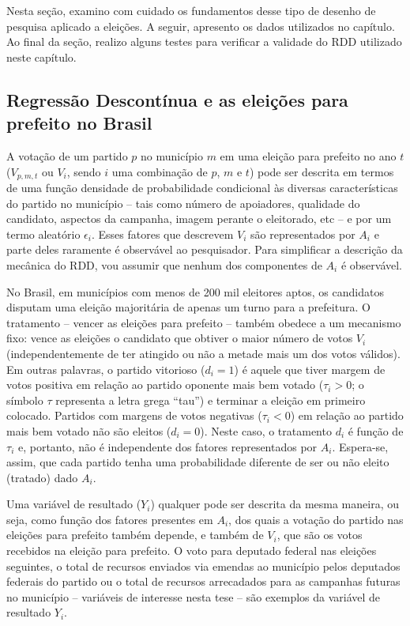 Nesta seção, examino com cuidado os fundamentos desse tipo de desenho de pesquisa aplicado a eleições. A seguir, apresento os dados utilizados no capítulo. Ao final da seção, realizo alguns testes para verificar a validade do RDD utilizado neste capítulo.

\subsection{Regressão Descontínua e as eleições para prefeito no Brasil}

A votação de um partido $p$ no município $m$ em uma eleição para prefeito no ano $t$  ($V_{p,m,t}$ ou $V_{i}$, sendo $i$ uma combinação de $p$, $m$ e $t$) pode ser descrita em termos de uma função densidade de probabilidade condicional às diversas características do partido no município -- tais como número de apoiadores, qualidade do candidato, aspectos da campanha, imagem perante o eleitorado, etc -- e por um termo aleatório $\epsilon_{i}$. Esses fatores que descrevem $V_{i}$ são representados por $A_{i}$ e parte deles raramente é observável ao pesquisador. Para simplificar a descrição da mecânica do RDD, vou assumir que nenhum dos componentes de $A_{i}$ é observável. 

No Brasil, em municípios com menos de 200 mil eleitores aptos, os candidatos disputam uma eleição majoritária de apenas um turno para a prefeitura. O tratamento -- vencer as eleições para prefeito -- também obedece a um mecanismo fixo: vence as eleições o candidato que obtiver o maior número de votos $V_{i}$ (independentemente de ter atingido ou não a metade mais um dos votos válidos). Em outras palavras, o partido vitorioso ($d_{i}=1$) é aquele que tiver margem de votos positiva em relação ao partido oponente mais bem votado ($\tau_{i}>0$; o símbolo $\tau$ representa a letra grega ``tau'') e terminar a eleição em primeiro colocado. Partidos com margens de votos negativas ($\tau_{i}<0$) em relação ao partido mais bem votado não são eleitos ($d_{i}=0$).  Neste caso, o tratamento $d_{i}$ é função de $\tau_{i}$ e, portanto, não é independente dos fatores representados por $A_{i}$. Espera-se, assim, que cada partido tenha uma probabilidade diferente de ser ou não eleito (tratado) dado $A_{i}$.

Uma variável de resultado ($Y_{i}$) qualquer pode ser descrita da mesma maneira, ou seja, como função dos fatores presentes em $A_{i}$, dos quais a votação do partido nas eleições para prefeito também depende, e também de $V_{i}$, que são os votos recebidos na eleição para prefeito. O voto para deputado federal nas eleições seguintes, o total de recursos enviados via emendas ao município pelos deputados federais do partido ou o total de recursos arrecadados para as campanhas futuras no município -- variáveis de interesse nesta tese -- são exemplos da variável de resultado $Y_{i}$.

